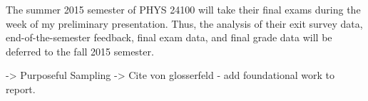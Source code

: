 The summer 2015 semester of PHYS 24100 will take their final exams during the week of my preliminary presentation. Thus, the analysis of their exit survey data, end-of-the-semester feedback, final exam data, and final grade data will be deferred to the fall 2015 semester.


-> Purposeful Sampling
-> Cite von glosserfeld - add foundational work to report.
